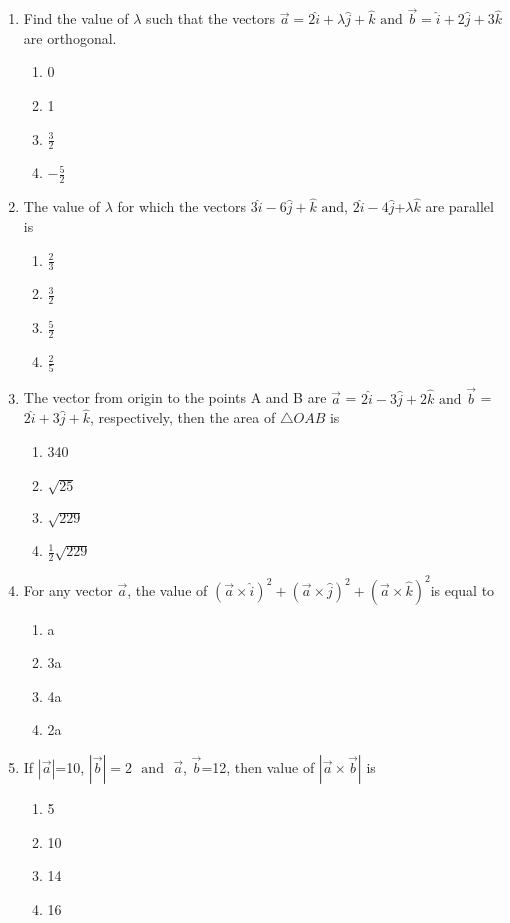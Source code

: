 \documentclass{article}
\providecommand{\abs}[1]{\left\vert#1\right\vert}
\begin{document}
\begin{enumerate}
\item Find the value of $\lambda$ such that the vectors $\vec{a}=2\hat{i}+\lambda\hat{j}+\hat{k}$ $\text{and}$ $\vec{b}=\hat{i}+2\hat{j}+3\hat{k}$ are orthogonal.
	\begin{enumerate}
\item 0
\item 1 
\item $\frac{3}{2}$
\item $-\frac{5}{2}$
	\end{enumerate}

\item The value of $\lambda$ for which the vectors $3\hat{i}-6\hat{j}+\hat{k}$ $\text{and}$,  $2\hat{i}-4\hat{j}$+$\lambda\hat{k}$ are parallel is
	\begin{enumerate}
\item $\frac{2}{3}$
\item $\frac{3}{2}$
\item $\frac{5}{2}$
\item $\frac{2}{5}$
	\end{enumerate}	

\item The vector from origin to the points A and B are $\vec{a}$ = $2\hat{i}-3\hat{j}+2\hat{k}$ $\text{and}$  $\vec{b}$ = $2\hat{i}+3\hat{j}+\hat{k}$, respectively, then the area of $\triangle {OAB}$ is
	\begin{enumerate}
\item 340 
\item $\sqrt{25}$
\item $\sqrt{229}$
\item $\frac{1}{2}\sqrt{229}$
\end{enumerate}


\item For any vector $\vec{a}$, the value of $(\vec{a}\times\hat{i})^2+(\vec{a}\times\hat{j})^2 + (\vec{a}\times\hat{k})^2$is equal to 
	\begin{enumerate}
\item a 
\item 3a
\item 4a
\item 2a
\end{enumerate}


\item If $\abs{\vec{a}}$=10, $\abs{\vec{b}}=2$ $\text{ and }$  $\vec{a}$, $\vec{b}$=12, then value of $\abs{\vec{a}\times\vec{b}}$ is
	\begin{enumerate}
\item 5 
\item 10 
\item 14 
\item 16
\end{enumerate}



\end{enumerate}
\end{document}
